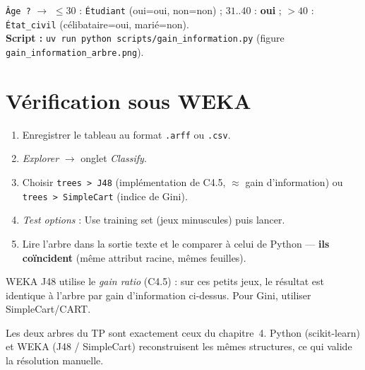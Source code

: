 \begin{Exemple}
\texttt{Âge ?} $\rightarrow$ $\le30$ : \texttt{Étudiant} (oui=oui, non=non) ; $31..40$ : \textbf{oui} ;
$>40$ : \texttt{État\_civil} (célibataire=oui, marié=non).\\
\textbf{Script :} \texttt{uv run python scripts/gain\_information.py} (figure
\texttt{gain\_information\_arbre.png}).
\end{Exemple}

\section{Vérification sous WEKA}
\begin{enumerate}[leftmargin=1.6em,nosep]
  \item Enregistrer le tableau au format \texttt{.arff} ou \texttt{.csv}.
  \item \emph{Explorer} $\rightarrow$ onglet \emph{Classify}.
  \item Choisir \texttt{trees > J48} (implémentation de C4.5, $\approx$ gain d'information) ou
        \texttt{trees > SimpleCart} (indice de Gini).
  \item \emph{Test options} : \og Use training set \fg{} (jeux minuscules) puis lancer.
  \item Lire l'arbre dans la sortie texte et le comparer à celui de Python — \textbf{ils
        coïncident} (même attribut racine, mêmes feuilles).
\end{enumerate}

\begin{Astuce}
WEKA J48 utilise le \emph{gain ratio} (C4.5) : sur ces petits jeux, le résultat est identique
à l'arbre par gain d'information ci-dessus. Pour Gini, utiliser SimpleCart/CART.
\end{Astuce}

\begin{Resume}
Les deux arbres du TP sont exactement ceux du chapitre~4. Python (scikit-learn) et WEKA
(J48 / SimpleCart) reconstruisent les mêmes structures, ce qui valide la résolution manuelle.
\end{Resume}

